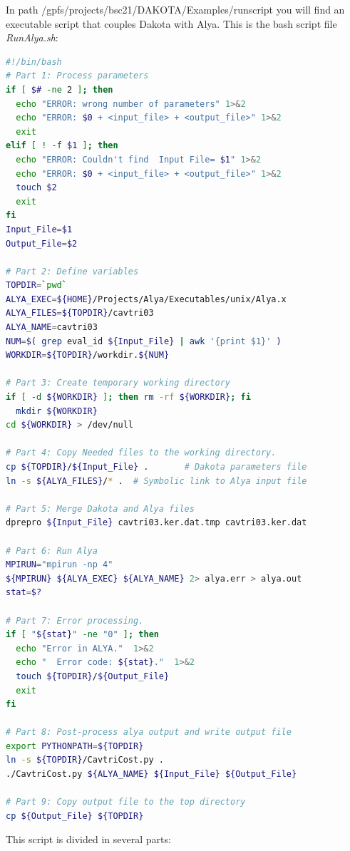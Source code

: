 \documentclass[12pt,a4paper,article]{memoir}
\begin{document}
In path /gpfs/projects/bsc21/DAKOTA/Examples/runscript you will find an executable script that couples Dakota with Alya. This is the bash script file \textit{RunAlya.sh}:

\begin{lstlisting}[style=MyCodeStyle,language=bash]
#!/bin/bash
# Part 1: Process parameters
if [ $# -ne 2 ]; then
  echo "ERROR: wrong number of parameters" 1>&2
  echo "ERROR: $0 + <input_file> + <output_file>" 1>&2
  exit
elif [ ! -f $1 ]; then
  echo "ERROR: Couldn't find  Input File= $1" 1>&2
  echo "ERROR: $0 + <input_file> + <output_file>" 1>&2
  touch $2
  exit 
fi
Input_File=$1
Output_File=$2

# Part 2: Define variables
TOPDIR=`pwd`
ALYA_EXEC=${HOME}/Projects/Alya/Executables/unix/Alya.x
ALYA_FILES=${TOPDIR}/cavtri03
ALYA_NAME=cavtri03
NUM=$( grep eval_id ${Input_File} | awk '{print $1}' )
WORKDIR=${TOPDIR}/workdir.${NUM}

# Part 3: Create temporary working directory
if [ -d ${WORKDIR} ]; then rm -rf ${WORKDIR}; fi
  mkdir ${WORKDIR}
cd ${WORKDIR} > /dev/null

# Part 4: Copy Needed files to the working directory.
cp ${TOPDIR}/${Input_File} .       # Dakota parameters file
ln -s ${ALYA_FILES}/* .  # Symbolic link to Alya input file

# Part 5: Merge Dakota and Alya files
dprepro ${Input_File} cavtri03.ker.dat.tmp cavtri03.ker.dat

# Part 6: Run Alya
MPIRUN="mpirun -np 4"
${MPIRUN} ${ALYA_EXEC} ${ALYA_NAME} 2> alya.err > alya.out
stat=$?

# Part 7: Error processing.
if [ "${stat}" -ne "0" ]; then
  echo "Error in ALYA."  1>&2
  echo "  Error code: ${stat}."  1>&2
  touch ${TOPDIR}/${Output_File}
  exit
fi

# Part 8: Post-process alya output and write output file
export PYTHONPATH=${TOPDIR}
ln -s ${TOPDIR}/CavtriCost.py .
./CavtriCost.py ${ALYA_NAME} ${Input_File} ${Output_File}

# Part 9: Copy output file to the top directory
cp ${Output_File} ${TOPDIR}
\end{lstlisting}

This script is divided in several parts:
\end{document}
